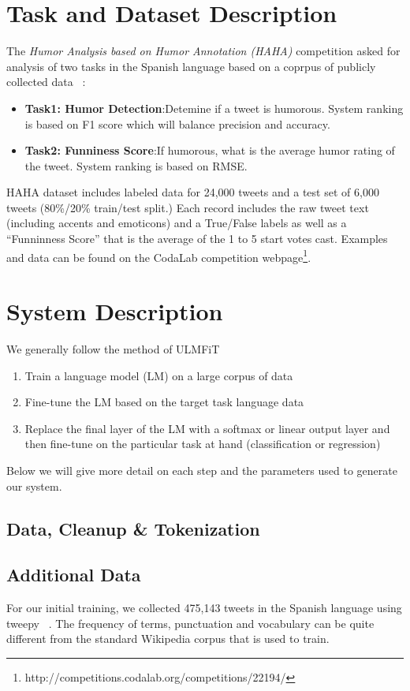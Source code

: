 \documentclass[smallcondensed]{svjour3}     %
\begin{document}
\section{Task and Dataset Description}
\label{sec:task}
The \textit{Humor Analysis based on Humor Annotation (HAHA)} competition asked for analysis of two tasks in the Spanish language based on a coprpus of publicly collected data ~\cite{castro2018crowd}:
\begin{itemize}
\item \textbf{Task1: Humor Detection}:Detemine if a tweet is humorous. System ranking is based on F1 score which will balance precision and accuracy.
\item \textbf{Task2: Funniness Score}:If humorous, what is the average humor rating of the tweet. System ranking is based on RMSE.
\end{itemize}
HAHA dataset includes labeled data for 24,000 tweets and a test set of 6,000 tweets (80\%/20\% train/test split.)  Each record includes the raw tweet text (including accents and emoticons) and a True/False labels as well as a ``Funninness Score'' that is the average of the 1 to 5 start votes cast.  Examples and data can be found on the CodaLab competition webpage\footnote{http://competitions.codalab.org/competitions/22194/}.

\section{System Description}
\label{sec:system}
We generally follow the method of ULMFiT ~\cite{DBLP:journals/corr/abs-1801-06146}
\begin{enumerate}
	\item Train a language model (LM) on a large corpus of data
	\item Fine-tune the LM based on the target task language data
	\item Replace the final layer of the LM with a softmax or linear output layer and then fine-tune on the particular task at hand (classification or regression)
\end{enumerate}
Below we will give more detail on each step and the parameters used to generate our system.
\subsection{Data, Cleanup \& Tokenization}
\label{sec:datacleaning}
\subsection{Additional Data}
For our initial training, we  collected 475,143 tweets in the Spanish language using tweepy ~\cite{Tweepy}.  The frequency of terms, punctuation and vocabulary can be quite different from the standard Wikipedia corpus that is used to train.
\end{document}
